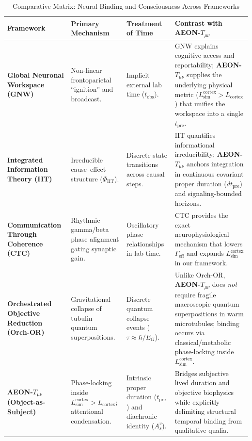 \documentclass[11pt,a4paper]{article}
\begin{document}
\begin{table}[htbp]
\centering
\caption{Comparative Matrix: Neural Binding and Consciousness Across Frameworks}
\label{tab:comp}
\small
\begin{tabularx}{\textwidth}{@{}p{2.7cm}p{2.8cm}p{2.9cm}X@{}}
\toprule
\textbf{Framework} & \textbf{Primary Mechanism} & \textbf{Treatment of Time} & \textbf{Contrast with AEON-$T_{\mu\nu}$} \\
\midrule
\textbf{Global Neuronal Workspace (GNW)} \cite{dehaene2011} & Non-linear frontoparietal ``ignition'' and broadcast. & Implicit external lab time ($t_{\mathrm{obs}}$). & GNW explains cognitive access and reportability; \textbf{AEON-$T_{\mu\nu}$} supplies the underlying physical metric ($L_{\mathrm{sim}}^{\mathrm{cortex}} > L_{\mathrm{cortex}}$) that unifies the workspace into a single $t_{\mathrm{pre}}$. \\
\addlinespace
\textbf{Integrated Information Theory (IIT)} \cite{tononi2016} & Irreducible cause--effect structure ($\Phi_{\mathrm{IIT}}$). & Discrete state transitions across causal steps. & IIT quantifies informational irreducibility; \textbf{AEON-$T_{\mu\nu}$} anchors integration in continuous covariant proper duration ($dt_{\mathrm{pre}}$) and signaling-bounded horizons. \\
\addlinespace
\textbf{Communication Through Coherence (CTC)} \cite{fries2015} & Rhythmic gamma/beta phase alignment gating synaptic gain. & Oscillatory phase relationships in lab time. & CTC provides the exact neurophysiological mechanism that lowers $\Gamma_{\mathrm{eff}}$ and expands $L_{\mathrm{sim}}^{\mathrm{cortex}}$ in our framework. \\
\addlinespace
\textbf{Orchestrated Objective Reduction (Orch-OR)} \cite{hameroff2014} & Gravitational collapse of tubulin quantum superpositions. & Discrete quantum collapse events ($\tau \approx \hbar / E_G$). & Unlike Orch-OR, \textbf{AEON-$T_{\mu\nu}$} does \emph{not} require fragile macroscopic quantum superpositions in warm microtubules; binding occurs via classical/metabolic phase-locking inside $L_{\mathrm{sim}}^{\mathrm{cortex}}$. \\
\addlinespace
\textbf{AEON-$T_{\mu\nu}$ (Object-as-Subject)} & Phase-locking inside $L_{\mathrm{sim}}^{\mathrm{cortex}} > L_{\mathrm{cortex}}$; attentional condensation. & Intrinsic proper duration ($t_{\mathrm{pre}}$) and diachronic identity ($A_s^v$). & Bridges subjective lived duration and objective biophysics while explicitly delimiting structural temporal binding from qualitative qualia. \\
\bottomrule
\end{tabularx}
\end{table}
\end{document}
